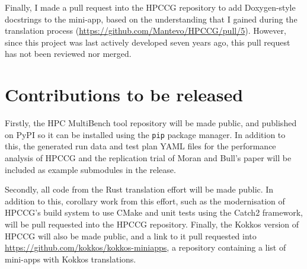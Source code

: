 Finally, I made a pull request into the HPCCG repository to add Doxygen-style docstrings to the mini-app, based on the understanding that I gained during the translation process (\url{https://github.com/Mantevo/HPCCG/pull/5}). However, since this project was last actively developed seven years ago, this pull request has not been reviewed nor merged.

\section{Contributions to be released}
\label{ssec:open-source-to-be-released}

Firstly, the HPC MultiBench tool repository will be made public, and published on PyPI so it can be installed using the \texttt{pip} package manager. In addition to this, the generated run data and test plan YAML files for the performance analysis of HPCCG and the replication trial of Moran and Bull's paper \cite{moranEmergingTechnologiesRust2023} will be included as example submodules in the release.

Secondly, all code from the Rust translation effort will be made public. In addition to this, corollary work from this effort, such as the modernisation of HPCCG's build system to use CMake and unit tests using the Catch2 framework, will be pull requested into the HPCCG repository. Finally, the Kokkos version of HPCCG will also be made public, and a link to it pull requested into \url{https://github.com/kokkos/kokkos-miniapps}, a repository containing a list of mini-apps with Kokkos translations.


